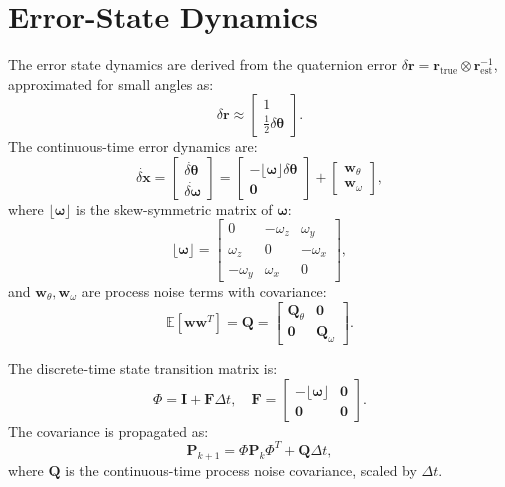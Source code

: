 \documentclass[a4paper,10pt]{article}
\begin{document}
\section{Error-State Dynamics}
The error state dynamics are derived from the quaternion error $\delta \mathbf{r} = \mathbf{r}_{\text{true}} \otimes \mathbf{r}_{\text{est}}^{-1}$, approximated for small angles as:
\[
\delta \mathbf{r} \approx \begin{bmatrix} 1 \\ \frac{1}{2} \delta \boldsymbol{\theta} \end{bmatrix}.
\]
The continuous-time error dynamics are:
\[
\dot{\delta \mathbf{x}} = \begin{bmatrix} \dot{\delta \boldsymbol{\theta}} \\ \dot{\delta \boldsymbol{\omega}} \end{bmatrix} = \begin{bmatrix} -\lfloor \boldsymbol{\omega} \rfloor \delta \boldsymbol{\theta} \\ \mathbf{0} \end{bmatrix} + \begin{bmatrix} \mathbf{w}_{\theta} \\ \mathbf{w}_{\omega} \end{bmatrix},
\]
where $\lfloor \boldsymbol{\omega} \rfloor$ is the skew-symmetric matrix of $\boldsymbol{\omega}$:
\[
\lfloor \boldsymbol{\omega} \rfloor = \begin{bmatrix}
0 & -\omega_z & \omega_y \\
\omega_z & 0 & -\omega_x \\
-\omega_y & \omega_x & 0
\end{bmatrix},
\]
and $\mathbf{w}_{\theta}, \mathbf{w}_{\omega}$ are process noise terms with covariance:
\[
\mathbb{E}[\mathbf{w} \mathbf{w}^T] = \mathbf{Q} = \begin{bmatrix} \mathbf{Q}_{\theta} & \mathbf{0} \\ \mathbf{0} & \mathbf{Q}_{\omega} \end{bmatrix}.
\]

The discrete-time state transition matrix is:
\[
\Phi = \mathbf{I} + \mathbf{F} \Delta t, \quad \mathbf{F} = \begin{bmatrix} -\lfloor \boldsymbol{\omega} \rfloor & \mathbf{0} \\ \mathbf{0} & \mathbf{0} \end{bmatrix}.
\]
The covariance is propagated as:
\[
\mathbf{P}_{k+1} = \Phi \mathbf{P}_k \Phi^T + \mathbf{Q} \Delta t,
\]
where $\mathbf{Q}$ is the continuous-time process noise covariance, scaled by $\Delta t$.
\end{document}
